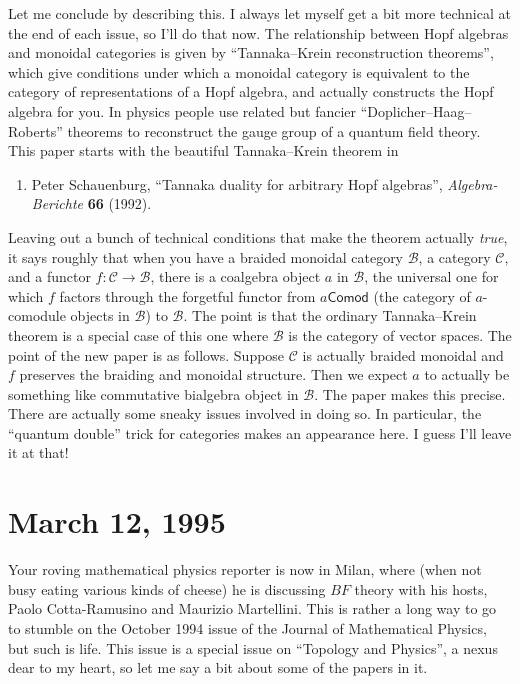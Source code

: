 \documentclass[12pt]{article}
\def\tightlist{}
\begin{document}
Let me conclude by describing this. I always let myself get a bit more
technical at the end of each issue, so I'll do that now. The
relationship between Hopf algebras and monoidal categories is given by
``Tannaka--Krein reconstruction theorems'', which give conditions under
which a monoidal category is equivalent to the category of
representations of a Hopf algebra, and actually constructs the Hopf
algebra for you. In physics people use related but fancier
``Doplicher--Haag--Roberts'' theorems to reconstruct the gauge group of a
quantum field theory. This paper starts with the beautiful Tannaka--Krein
theorem in

\begin{enumerate}
\def\labelenumi{\arabic{enumi})}
\setcounter{enumi}{4}
\tightlist
\item
  Peter Schauenburg, ``Tannaka duality for arbitrary Hopf algebras'', 
  \emph{Algebra-Berichte} \textbf{66} (1992).
\end{enumerate}

Leaving out a bunch of technical conditions that make the theorem
actually \emph{true}, it says roughly that when you have a braided monoidal
category \(\mathcal{B}\), a category \(\mathcal{C}\), and a functor
\(f\colon \mathcal{C} \to \mathcal{B}\), there is a coalgebra object
\(a\) in \(\mathcal{B}\), the universal one for which \(f\) factors
through the forgetful functor from \(a\mathsf{Comod}\) (the category of
\(a\)-comodule objects in \(\mathcal{B}\)) to \(\mathcal{B}\). The point
is that the ordinary Tannaka--Krein theorem is a special case of this one
where \(\mathcal{B}\) is the category of vector spaces. The point of the
new paper is as follows. Suppose \(\mathcal{C}\) is actually braided
monoidal and \(f\) preserves the braiding and monoidal structure. Then
we expect \(a\) to actually be something like commutative bialgebra
object in \(\mathcal{B}\). The paper makes this precise. There are
actually some sneaky issues involved in doing so. In particular, the
``quantum double'' trick for categories makes an appearance here. I
guess I'll leave it at that!



\hypertarget{week50}{%
\section{March 12, 1995}\label{week50}}

Your roving mathematical physics reporter is now in Milan, where (when
not busy eating various kinds of cheese) he is discussing \(BF\) theory
with his hosts, Paolo Cotta-Ramusino and Maurizio Martellini. This is
rather a long way to go to stumble on the October 1994 issue of the
Journal of Mathematical Physics, but such is life. This issue is a
special issue on ``Topology and Physics'', a nexus dear to my heart, so
let me say a bit about some of the papers in it.
\end{document}
